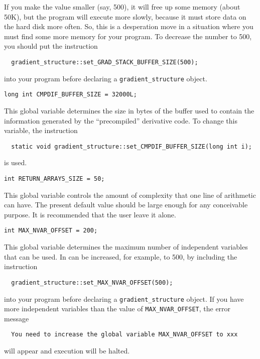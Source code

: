 \documentclass{admbmanual}
\begin{document}
If you make the value smaller (say, 500), 
it will free up some memory (about 50K),
but the program will execute more slowly, because it must store
data on the hard disk more often. So, this is a desperation move
in a situation where you must find some more memory for your program. 
To decrease the number to 500, you should put the instruction
\begin{lstlisting}
  gradient_structure::set_GRAD_STACK_BUFFER_SIZE(500);  
\end{lstlisting} 
into your program before declaring a \texttt{gradient\_structure} object.


\bigskip
{}
\begin{lstlisting}
long int CMPDIF_BUFFER_SIZE = 32000L;  
\end{lstlisting}
This global variable determines the size in bytes of the buffer used to contain
the information generated by the ``precompiled'' derivative code.
To change this variable, the instruction
\begin{lstlisting}
  static void gradient_structure::set_CMPDIF_BUFFER_SIZE(long int i);
\end{lstlisting}
is used.

\bigskip
{}
\begin{lstlisting}
int RETURN_ARRAYS_SIZE = 50;  
\end{lstlisting}
This global variable controls the amount of complexity that one
line of arithmetic can have. The present default value should 
be large enough for any
conceivable purpose. It is recommended that the user leave it alone.


\bigskip
{}
\begin{lstlisting}
int MAX_NVAR_OFFSET = 200;  
\end{lstlisting}  
This global variable determines the maximum number of independent
variables that can be used. 
In can be increased, for example, to 500, by including the instruction
\begin{lstlisting}
  gradient_structure::set_MAX_NVAR_OFFSET(500);  
\end{lstlisting}
into your program before declaring a \texttt{gradient\_structure} object.
If you have more independent variables than the value of
\texttt{MAX\_NVAR\_OFFSET}, the error message 
\begin{lstlisting}
  You need to increase the global variable MAX_NVAR_OFFSET to xxx
\end{lstlisting}
will appear and execution will be halted.
 {}
 
\end{document}
